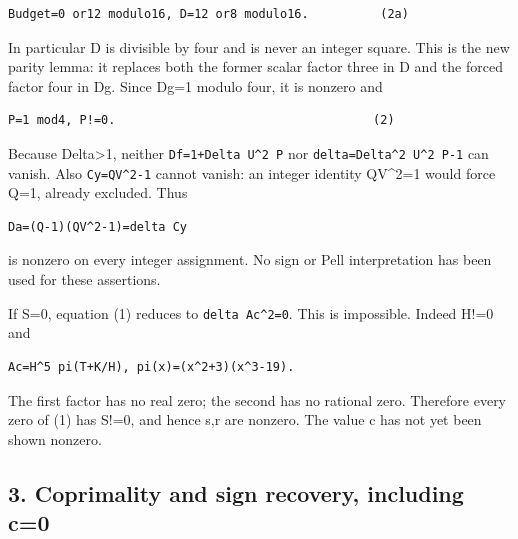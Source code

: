 \begin{verbatim}
Budget=0 or12 modulo16, D=12 or8 modulo16.          (2a)
\end{verbatim}

In particular D is divisible by four and is never an integer square. This is the new parity lemma: it replaces both the former scalar factor three in D and the forced factor four in Dg. Since Dg=\allowbreak{}1 modulo four, it is nonzero and



\begin{verbatim}
P=1 mod4, P!=0.                                    (2)
\end{verbatim}

Because Delta\textgreater{}\allowbreak{}1, neither \texttt{Df=\allowbreak{}1+\allowbreak{}Delta U\textasciicircum{}\allowbreak{}2 P} nor \texttt{delta=\allowbreak{}Delta\textasciicircum{}\allowbreak{}2 U\textasciicircum{}\allowbreak{}2 P-1} can vanish. Also \texttt{Cy=\allowbreak{}QV\textasciicircum{}\allowbreak{}2-1} cannot vanish: an integer identity QV\textasciicircum{}\allowbreak{}2=\allowbreak{}1 would force Q=\allowbreak{}1, already excluded. Thus



\begin{verbatim}
Da=(Q-1)(QV^2-1)=delta Cy
\end{verbatim}

is nonzero on every integer assignment. No sign or Pell interpretation has been used for these assertions.



If S=\allowbreak{}0, equation (1) reduces to \texttt{delta Ac\textasciicircum{}\allowbreak{}2=\allowbreak{}0}. This is impossible. Indeed H!=\allowbreak{}0 and



\begin{verbatim}
Ac=H^5 pi(T+K/H), pi(x)=(x^2+3)(x^3-19).
\end{verbatim}

The first factor has no real zero; the second has no rational zero. Therefore every zero of (1) has S!=\allowbreak{}0, and hence s,r are nonzero. The value c has not yet been shown nonzero.



\subsection{3. Coprimality and sign recovery, including c=\allowbreak{}0}



